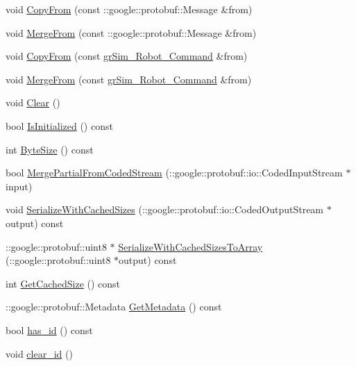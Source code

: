 \begin{DoxyCompactItemize}
\item 
void \hyperlink{classgr_sim___robot___command_aee9dbc25e7954607be2e0527e494d429}{Copy\-From} (const \-::google\-::protobuf\-::\-Message \&from)
\item 
void \hyperlink{classgr_sim___robot___command_a7d806479f38b9752a835df3b5a5c20bb}{Merge\-From} (const \-::google\-::protobuf\-::\-Message \&from)
\item 
void \hyperlink{classgr_sim___robot___command_a41573d7a7103261a722b872172b455ee}{Copy\-From} (const \hyperlink{classgr_sim___robot___command}{gr\-Sim\-\_\-\-Robot\-\_\-\-Command} \&from)
\item 
void \hyperlink{classgr_sim___robot___command_adca09542399232c0791d79b09b41eb17}{Merge\-From} (const \hyperlink{classgr_sim___robot___command}{gr\-Sim\-\_\-\-Robot\-\_\-\-Command} \&from)
\item 
void \hyperlink{classgr_sim___robot___command_a166cdbc3277992e877427e3b2701cfb5}{Clear} ()
\item 
bool \hyperlink{classgr_sim___robot___command_a9e6ad174ed4d1f98bad9a262c80f7ea1}{Is\-Initialized} () const 
\item 
int \hyperlink{classgr_sim___robot___command_aa34826da42e10319f6e7e7a2470920cb}{Byte\-Size} () const 
\item 
bool \hyperlink{classgr_sim___robot___command_adcf2f2ae7f496f200866c5b54534556a}{Merge\-Partial\-From\-Coded\-Stream} (\-::google\-::protobuf\-::io\-::\-Coded\-Input\-Stream $\ast$input)
\item 
void \hyperlink{classgr_sim___robot___command_a544256c6549e9dca15a43fa8f201bd85}{Serialize\-With\-Cached\-Sizes} (\-::google\-::protobuf\-::io\-::\-Coded\-Output\-Stream $\ast$output) const 
\item 
\-::google\-::protobuf\-::uint8 $\ast$ \hyperlink{classgr_sim___robot___command_a101eb73e4ea780c59b9ba24ee52e75a4}{Serialize\-With\-Cached\-Sizes\-To\-Array} (\-::google\-::protobuf\-::uint8 $\ast$output) const 
\item 
int \hyperlink{classgr_sim___robot___command_aba670bf6197d2f56981a593170588e39}{Get\-Cached\-Size} () const 
\item 
\-::google\-::protobuf\-::\-Metadata \hyperlink{classgr_sim___robot___command_a972b5850c9988c86d814d0f5498bed8e}{Get\-Metadata} () const 
\item 
bool \hyperlink{classgr_sim___robot___command_acab670bb9cfc5090aff75408ef099584}{has\-\_\-id} () const 
\item 
void \hyperlink{classgr_sim___robot___command_aab2bcfeb35e6ba9d873eb72bb0621db6}{clear\-\_\-id} ()

\end{DoxyCompactItemize}
